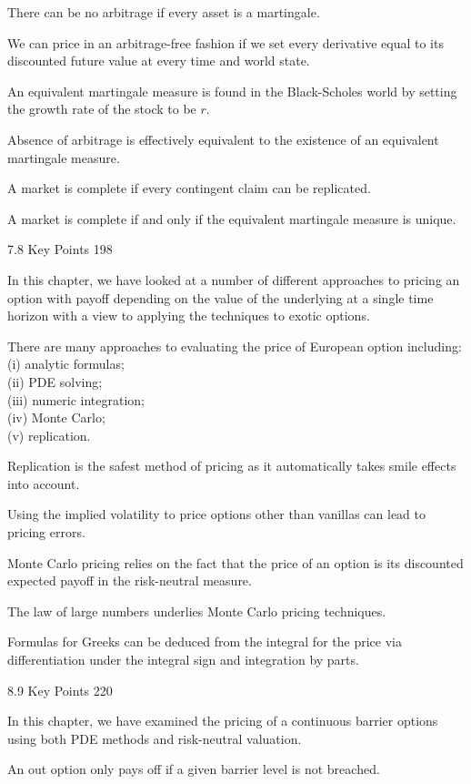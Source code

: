 There can be no arbitrage if every asset is a martingale.

We can price in an arbitrage-free fashion if we set every derivative equal to its discounted future value at every time and world state.

An equivalent martingale measure is found in the Black-Scholes world by setting the growth rate of the stock to be $r$.

Absence of arbitrage is effectively equivalent to the existence of an equivalent martingale measure.

A market is complete if every contingent claim can be replicated.

A market is complete if and only if the equivalent martingale measure is unique.

7.8 Key Points 198

In this chapter, we have looked at a number of different approaches to pricing an option with payoff depending on the value of the underlying at a single time horizon with a view to applying the techniques to exotic options.

There are many approaches to evaluating the price of European option including: \\
(i) analytic formulas; \\
(ii) PDE solving; \\
(iii) numeric integration; \\
(iv) Monte Carlo; \\
(v) replication.

Replication is the safest method of pricing as it automatically takes smile effects into account.

Using the implied volatility to price options other than vanillas can lead to pricing errors.

Monte Carlo pricing relies on the fact that the price of an option is its discounted expected payoff in the risk-neutral measure.

The law of large numbers underlies Monte Carlo pricing techniques.

Formulas for Greeks can be deduced from the integral for the price via differentiation under the integral sign and integration by parts.

8.9 Key Points 220

In this chapter, we have examined the pricing of a continuous barrier options using both PDE methods and risk-neutral valuation.

An out option only pays off if a given barrier level is not breached.

